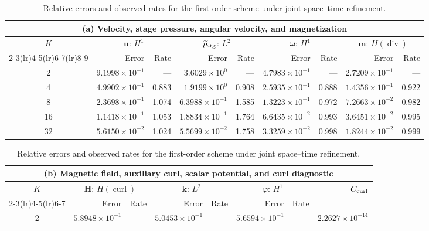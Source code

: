 \documentclass[11pt,a4paper]{article}
\newcommand{\bs}{\boldsymbol}
\DeclareMathOperator{\curl}{curl}
\DeclareMathOperator{\ddiv}{div}
\newcommand{\Div}{\ddiv}
\newcommand{\pp}{\widetilde p}
\theoremstyle{definition}
\numberwithin{equation}{section}
\begin{document}
\begin{table}[H]
\centering
\caption{Relative errors and observed rates for the first-order scheme under joint space--time refinement.}
\label{tab:first-order-errors}
\begingroup
\small
\setlength{\tabcolsep}{3.5pt}
\renewcommand{\arraystretch}{1.10}
\begin{tabular}{@{}c*{8}{r}@{}}
\toprule
\multicolumn{9}{c}{(a) Velocity, stage pressure, angular velocity, and magnetization}\\
\midrule
$K$ & \multicolumn{2}{c}{$\bs u$: $H^1$} & \multicolumn{2}{c}{$\pp_{\rm stg}$: $L^2$} & \multicolumn{2}{c}{$\bs\omega$: $H^1$} & \multicolumn{2}{c}{$\bs m$: $H(\Div)$}\\
\cmidrule(lr){2-3}\cmidrule(lr){4-5}\cmidrule(lr){6-7}\cmidrule(lr){8-9}
 & Error & Rate & Error & Rate & Error & Rate & Error & Rate\\
\midrule
2 & $9.1998\!\times\!10^{-1}$ & --- & $3.6029\!\times\!10^{0}$ & --- & $4.7983\!\times\!10^{-1}$ & --- & $2.7209\!\times\!10^{-1}$ & ---\\
4 & $4.9902\!\times\!10^{-1}$ & 0.883 & $1.9199\!\times\!10^{0}$ & 0.908 & $2.5935\!\times\!10^{-1}$ & 0.888 & $1.4356\!\times\!10^{-1}$ & 0.922\\
8 & $2.3698\!\times\!10^{-1}$ & 1.074 & $6.3988\!\times\!10^{-1}$ & 1.585 & $1.3223\!\times\!10^{-1}$ & 0.972 & $7.2663\!\times\!10^{-2}$ & 0.982\\
16 & $1.1418\!\times\!10^{-1}$ & 1.053 & $1.8834\!\times\!10^{-1}$ & 1.764 & $6.6435\!\times\!10^{-2}$ & 0.993 & $3.6451\!\times\!10^{-2}$ & 0.995\\
32 & $5.6150\!\times\!10^{-2}$ & 1.024 & $5.5699\!\times\!10^{-2}$ & 1.758 & $3.3259\!\times\!10^{-2}$ & 0.998 & $1.8244\!\times\!10^{-2}$ & 0.999\\
\bottomrule
\end{tabular}
\par\medskip
\begin{tabular}{@{}c*{7}{r}@{}}
\toprule
\multicolumn{8}{c}{(b) Magnetic field, auxiliary curl, scalar potential, and curl diagnostic}\\
\midrule
$K$ & \multicolumn{2}{c}{$\bs H$: $H(\curl)$} & \multicolumn{2}{c}{$\bs k$: $L^2$} & \multicolumn{2}{c}{$\varphi$: $H^1$} & $C_{\rm curl}$\\
\cmidrule(lr){2-3}\cmidrule(lr){4-5}\cmidrule(lr){6-7}
 & Error & Rate & Error & Rate & Error & Rate & \\
\midrule
2 & $5.8948\!\times\!10^{-1}$ & --- & $5.0453\!\times\!10^{-1}$ & --- & $5.6594\!\times\!10^{-1}$ & --- & $2.2627\!\times\!10^{-14}$\\

\end{tabular}
\end{table}
\end{document}
